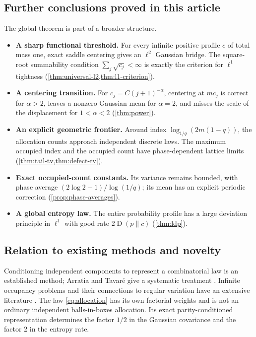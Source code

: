 \documentclass[11pt,a4paper]{article}
\numberwithin{equation}{section}
\theoremstyle{definition}
\theoremstyle{remark}
\newcommand{\KL}{\operatorname{D}}
\begin{document}
\subsection{Further conclusions proved in this article}
The global theorem is part of a broader structure.
\begin{itemize}
\item \textbf{A sharp functional threshold.} For every infinite positive
profile $c$ of total mass one, exact saddle centering gives an $\ell^2$
Gaussian bridge. The square-root summability condition
$\sum_j\sqrt{c_j}<\infty$ is exactly the criterion for $\ell^1$ tightness
(\cref{thm:universal-l2,thm:l1-criterion}).
\item \textbf{A centering transition.} For $c_j=C(j+1)^{-\alpha}$,
centering at $mc_j$ is correct for $\alpha>2$, leaves a nonzero Gaussian
mean for $\alpha=2$, and misses the scale of the displacement for
$1<\alpha<2$ (\cref{thm:power}).
\item \textbf{An explicit geometric frontier.} Around index
$\log_{1/q}(2m(1-q))$, the allocation counts approach independent
discrete laws. The maximum occupied index and the occupied count have
phase-dependent lattice limits (\cref{thm:tail-tv,thm:defect-tv}).
\item \textbf{Exact occupied-count constants.} Its variance remains
bounded, with phase average $(2\log2-1)/\log(1/q)$; its mean has an explicit
periodic correction (\cref{prop:phase-averages}).
\item \textbf{A global entropy law.} The entire probability profile has a
large deviation principle in $\ell^1$ with good rate $2\KL(p\|c)$
(\cref{thm:ldp}).
\end{itemize}

\subsection{Relation to existing methods and novelty}
Conditioning independent components to represent a combinatorial law is an
established method; Arratia and Tavar\'e give a systematic treatment
\cite{arratia-tavare}. Infinite occupancy problems and their connections to
regular variation have an extensive literature \cite{gnedin-hansen-pitman}.
The law \cref{eq:allocation} has its own factorial weights and is not an
ordinary independent balls-in-boxes allocation. Its exact parity-conditioned
representation determines the factor $1/2$ in the Gaussian covariance and
the factor $2$ in the entropy rate.
\end{document}
